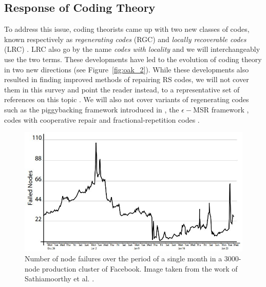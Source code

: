 \begin{multicols}{2}
	\subsection{Response of Coding Theory} \label{sec:response} 
	
	To address this issue, coding theorists came up with two new classes of codes, known respectively as {\em regenerating codes} (RGC) \cite{DimGodWuWaiRam} and {\em locally recoverable codes} (LRC) \cite{GopHuaSimYek}. LRC also go by the name {\em codes with locality} and we will interchangeably use the two terms.  These developments have led to the evolution of coding theory in two new directions (see Figure~\ref{fig:oak_2}).  While these developments also resulted in finding improved methods of repairing RS codes, we will not cover them in this survey and point the reader instead, to a representative set of  references on this topic \cite{ShaPapDimCai,GuruWoot,DauDuuKiaMil}. We will also not cover variants of regenerating codes such as the piggybacking framework introduced in \cite{RasShaRam_piggy}, the $\epsilon-$MSR framework \cite{RawTamGurEfr}, codes with cooperative repair \cite{HuXuWanZhaLi} and fractional-repetition codes \cite{ElRam}.


			\begin{figure}[H]
				\centering
				\includegraphics{src/Figures/chap4/FB_failures2.jpg}  
				\caption{Number of node failures over the period of a single month in a $3000$-node production cluster of Facebook. Image taken from the work of Sathiamoorthy et al. \cite{SathiaAstPap_Xorbas}.}  \label{fig:FB_failures}    
			\end{figure}      


\end{multicols}
